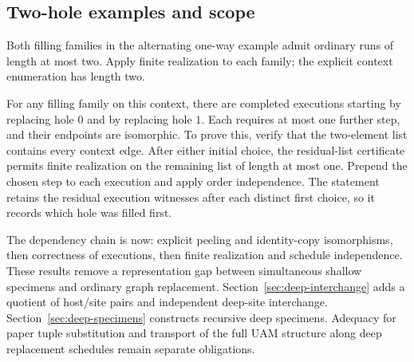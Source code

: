 \subsection{Two-hole examples and scope}
Both filling families in the alternating one-way example admit ordinary
runs of length at most two. Apply finite realization to each family;
the explicit context enumeration has length two.

For any filling family on this context, there are completed executions
starting by replacing hole $0$ and by replacing hole $1$. Each requires
at most one further step, and their endpoints are isomorphic. To prove
this, verify that the two-element list contains every context edge.
After either initial choice, the residual-list certificate permits
finite realization on the remaining list of length at most one.
Prepend the chosen step to each execution and apply order independence.
The statement retains the residual execution witnesses after each
distinct first choice, so it records which hole was filled first.

The dependency chain is now: explicit peeling and identity-copy
isomorphisms, then correctness of executions, then finite realization
and schedule independence. These results remove a representation gap
between simultaneous shallow specimens and ordinary graph replacement.
Section~\ref{sec:deep-interchange} adds a quotient of host/site pairs and
independent deep-site interchange. Section~\ref{sec:deep-specimens} constructs
recursive deep specimens. Adequacy for paper tuple substitution and transport
of the full UAM structure along deep replacement schedules remain separate
obligations.

